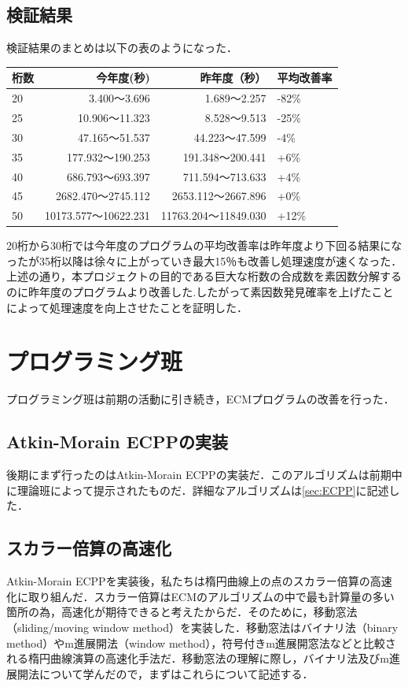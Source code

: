 \documentclass[openany,11pt,papersize]{jsbook}
\begin{document}
\subsection{検証結果}
検証結果のまとめは以下の表のようになった．

\begin{table}[htb]
  \begin{tabular}{|l|r|r||l|} \hline
    桁数 & 今年度(秒) & 昨年度（秒） & 平均改善率 \\ \hline \hline
    20 & 3.400～3.696             & 1.689～2.257             & -82\% \\ \hline
    25 & 10.906～11.323          & 8.528～9.513             & -25\% \\ \hline
    30 & 47.165～51.537          & 44.223～47.599          & -4\% \\ \hline
    35 & 177.932～190.253       & 191.348～200.441       & +6\% \\ \hline
    40 & 686.793～693.397       & 711.594～713.633       & +4\% \\ \hline
    45 & 2682.470～2745.112    & 2653.112～2667.896    & +0\% \\ \hline
    50 & 10173.577～10622.231 & 11763.204～11849.030 & +12\% \\ \hline
  \end{tabular}
\end{table}
20桁から30桁では今年度のプログラムの平均改善率は昨年度より下回る結果になったが35桁以降は徐々に上がっていき最大15％も改善し処理速度が速くなった．
上述の通り，本プロジェクトの目的である巨大な桁数の合成数を素因数分解するのに昨年度のプログラムより改善した.したがって素因数発見確率を上げたことによって処理速度を向上させたことを証明した．

\section{プログラミング班}
プログラミング班は前期の活動に引き続き，ECMプログラムの改善を行った．

\subsection{Atkin-Morain ECPPの実装}
後期にまず行ったのはAtkin-Morain ECPPの実装だ．このアルゴリズムは前期中に理論班によって提示されたものだ．詳細なアルゴリズムは\ref{sec:ECPP}に記述した．

\subsection{スカラー倍算の高速化}
Atkin-Morain ECPPを実装後，私たちは楕円曲線上の点のスカラー倍算の高速化に取り組んだ．スカラー倍算はECMのアルゴリズムの中で最も計算量の多い箇所の為，高速化が期待できると考えたからだ．そのために，移動窓法（sliding/moving window method）を実装した．移動窓法はバイナリ法（binary method）やm進展開法（window method），符号付きm進展開窓法などと比較される楕円曲線演算の高速化手法だ．移動窓法の理解に際し，バイナリ法及びm進展開法について学んだので，まずはこれらについて記述する．
\end{document}
